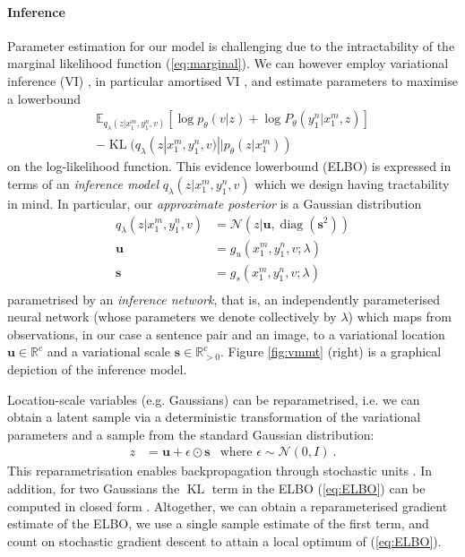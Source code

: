 \documentclass[11pt,a4paper]{article}
\DeclareMathOperator{\KL}{KL}
\DeclareMathOperator{\diag}{diag}
\begin{document}
\paragraph{Inference} Parameter estimation for our model is challenging due to the intractability of the marginal likelihood function (\ref{eq:marginal}).
We can however employ variational inference (VI) \cite{Jordan+1999:VI}, in particular amortised VI \citep{Kingma+2014:VAE,Rezende+14:DGM}, and estimate parameters to maximise a lowerbound
\begin{equation}\label{eq:ELBO}\begin{aligned}
\mathbb E_{q_\lambda(z|x_1^m,y_1^n, v)}\left [\log  p_\theta(v|z) + \log P_\theta(y_1^n|x_1^m, z)  \right] \\
- \KL(q_\lambda(z|x_1^m, y_1^n, v)||p_\theta(z|x_1^m)) 
\end{aligned}
\end{equation}
 on the log-likelihood function. 
This evidence lowerbound (ELBO) is expressed in terms of an  \emph{inference model} $q_\lambda(z|x_1^m, y_1^n, v)$ which we design having tractability in mind. In particular, our \emph{approximate posterior} is a Gaussian distribution 
\begin{equation}\begin{aligned}
q_\lambda(z|x_1^m, y_1^n, v) &= \mathcal N(z|\mathbf u, \diag(\mathbf s^2))\\
\mathbf u &= g_u(x_1^m, y_1^n, v; \lambda) \\
\mathbf s &= g_s(x_1^m, y_1^n, v; \lambda) \\
\end{aligned}
\end{equation}
parametrised by an \emph{inference network}, that is, an independently parameterised neural network (whose parameters we denote collectively by $\lambda$) which maps from observations, in our case a sentence pair and an image, to a variational location $\mathbf u \in \mathbb R^c$ and a variational scale $\mathbf s \in \mathbb R^c_{>0}$. 
Figure \ref{fig:vmmt} (right) is a graphical depiction of the inference model.


Location-scale variables (e.g. Gaussians) can be reparametrised, i.e. we can obtain a latent sample via a deterministic transformation of the variational parameters and a sample from the standard Gaussian  distribution:
\begin{equation}
\begin{aligned}
z &= \mathbf u + \epsilon \odot \mathbf s  & \text{where } \epsilon \sim \mathcal N(0, I) ~.
\end{aligned}
\end{equation}
This reparametrisation enables backpropagation through stochastic units \citep{Kingma+2014:VAE,TitsiasEtAl2014doubly}.
In addition, for two Gaussians the $\KL$ term in the ELBO (\ref{eq:ELBO}) can be computed in closed form \citep[Appendix B]{Kingma+2014:VAE}.
 Altogether, we can obtain a reparameterised gradient estimate of the ELBO, we use a single sample estimate of the first term,  and count on stochastic gradient descent to attain a local optimum of (\ref{eq:ELBO}).
\end{document}
